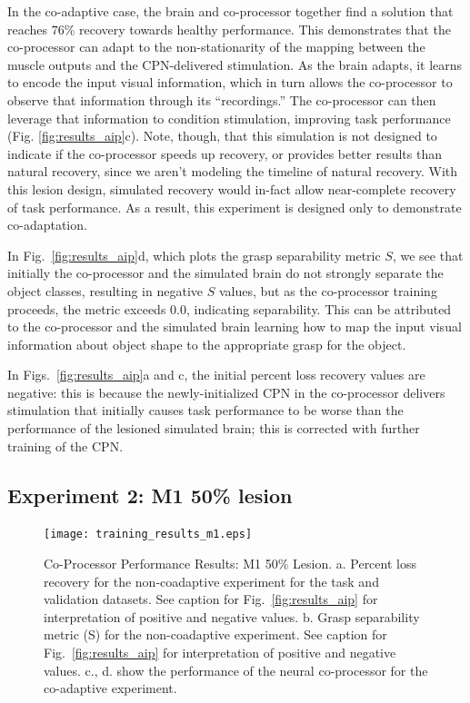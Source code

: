 \documentclass[12pt]{iopart}
\begin{document}
In the co-adaptive case, the brain and co-processor together find a solution that reaches $76\%$ recovery towards healthy
performance. This demonstrates that the co-processor can adapt to the non-stationarity
of the mapping between the muscle outputs and the CPN-delivered stimulation.
As the brain adapts, it learns to encode the input visual information, which in turn allows the co-processor
to observe that information through its ``recordings.'' The co-processor can then leverage that information to condition
stimulation, improving task performance (Fig. \ref{fig:results_aip}c). Note, though, that this simulation is not designed
to indicate if the co-processor speeds up recovery, or provides better results than natural recovery, since we aren't
modeling the timeline of natural recovery. With this lesion design, simulated recovery would in-fact allow near-complete
recovery of task performance. As a result, this experiment is designed  only to demonstrate co-adaptation.

In Fig.~\ref{fig:results_aip}d, which plots the grasp  separability metric $S$, we see that initially
the co-processor and the simulated brain do not strongly separate the object classes, resulting in negative $S$ values,
but as the co-processor  training proceeds, the metric exceeds 0.0, indicating separability. This can be attributed to
the co-processor and the simulated brain learning how to map the input visual information about object shape to the
appropriate grasp for
the object.

In Figs.\ \ref{fig:results_aip}a and c, the initial percent loss recovery values are negative: this is because the
newly-initialized CPN in the co-processor delivers stimulation that initially causes task performance to be worse
than the performance of the lesioned simulated brain; this is corrected with further training of the CPN. 

\subsection{Experiment 2: M1 50\% lesion}
\begin{figure}[h]
\centering
\texttt{[image: training\_results\_m1.eps]}
\caption{Co-Processor Performance Results: M1 50\% Lesion. a. Percent loss recovery
         for the non-coadaptive experiment for the task and validation datasets. See caption for Fig.~\ref{fig:results_aip}
         for interpretation of positive and negative values. b. Grasp separability metric (S) for the non-coadaptive experiment.
         See caption for Fig.~\ref{fig:results_aip} for interpretation of positive and negative values. c., d. show the
         performance of the neural co-processor for the co-adaptive experiment. 
         }
\label{fig:results_m1}
\end{figure}
\end{document}
